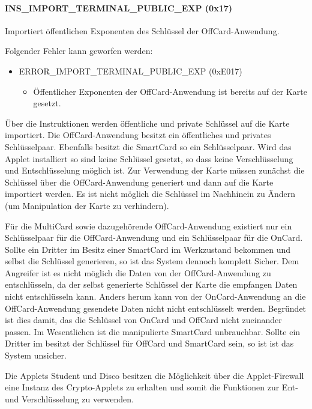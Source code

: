 \paragraph{INS\_IMPORT\_TERMINAL\_PUBLIC\_EXP (0x17)} Importiert öffentlichen Exponenten des Schlüssel der OffCard-Anwendung.

Folgender Fehler kann geworfen werden:
\begin{itemize}
	\item ERROR\_IMPORT\_TERMINAL\_PUBLIC\_EXP (0xE017)
	\begin{itemize}
		\item Öffentlicher Exponenten der OffCard-Anwendung ist bereits auf der Karte gesetzt.
	\end{itemize}
\end{itemize}

Über die Instruktionen werden öffentliche und private Schlüssel auf die Karte importiert.
Die OffCard-Anwendung besitzt ein öffentliches und privates Schlüsselpaar.
Ebenfalls besitzt die SmartCard so ein Schlüsselpaar.
Wird das Applet installiert so sind keine Schlüssel gesetzt, so dass keine Verschlüsselung und Entschlüsselung möglich ist.
Zur Verwendung der Karte müssen zunächst die Schlüssel über die OffCard-Anwendung generiert und dann auf die Karte importiert werden.
Es ist nicht möglich die Schlüssel im Nachhinein zu Ändern (um Manipulation der Karte zu verhindern).

Für die MultiCard sowie dazugehörende OffCard-Anwendung existiert nur ein Schlüsselpaar für die OffCard-Anwendung und ein Schlüsselpaar für die OnCard.
Sollte ein Dritter im Besitz einer SmartCard im Werkzustand bekommen und selbst die Schlüssel generieren, so ist das System dennoch komplett Sicher.
Dem Angreifer ist es nicht möglich die Daten von der OffCard-Anwendung zu entschlüsseln, da der selbst generierte Schlüssel der Karte die empfangen Daten nicht entschlüsseln kann.
Anders herum kann von der OnCard-Anwendung an die OffCard-Anwendung gesendete Daten nicht nicht entschlüsselt werden.
Begründet ist dies damit, das die Schlüssel von OnCard und OffCard nicht zueinander passen.
Im Wesentlichen ist die manipulierte SmartCard unbrauchbar.
Sollte ein Dritter im besitzt der Schlüssel für OffCard und SmartCard sein, so ist ist das System unsicher.

Die Applets Student und Disco besitzen die Möglichkeit über die Applet-Firewall eine Instanz des Crypto-Applets zu erhalten und somit die Funktionen zur Ent- und Verschlüsselung zu verwenden.

